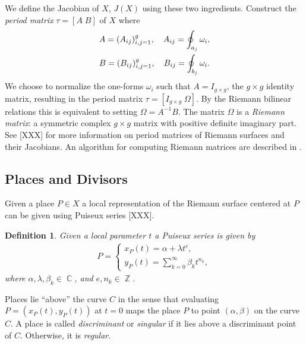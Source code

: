\documentclass[12pt]{article}
\newtheorem{definition}[theorem]{Definition}
\theoremstyle{definition}
\newtheorem{example}[theorem]{Example}
\DeclareMathOperator{\ZZ}{\mathbb{Z}}
\DeclareMathOperator{\CC}{\mathbb{C}}
\begin{document}
We define the Jacobian of $X$, $J(X)$ using these two
ingredients. Construct the {\it period matrix} $\tau = [A \; B]$ of $X$
where
\begin{gather} \label{eqn:periodmatrix}
  A = (A_{ij})_{i,j=1}^g, \quad A_{ij} = \oint_{a_j} \omega_i, \notag \\
  B = (B_{ij})_{i,j=1}^g, \quad B_{ij} = \oint_{b_j} \omega_i.
\end{gather}
We choose to normalize the one-forms $\omega_i$ such that $A = I_{g
  \times g}$, the $g \times g$ identity matrix, resulting in the period
matrix $\tau = [I_{g \times g} \; \Omega]$. By the Riemann bilinear
relations this is equivalent to setting $\Omega = A^{-1}B$. The matrix
$\Omega$ is a {\it Riemann matrix}: a symmetric complex $g \times g$
matrix with positive definite imaginary part. See [XXX] for more
information on period matrices of Riemann surfaces and their
Jacobians. An algorithm for computing Riemann matrices are described in
\cite{DeconinckPatterson08}.




\subsection{Places and Divisors}



Given a place $P \in X$ a local representation of the Riemann surface
centered at $P$ can be given using Puiseux series [XXX].
\begin{definition}\label{def:puiseux}
Given a local parameter $t$ a Puiseux series is given by
\begin{align} \label{eqn:puiseux}
  P =
  \begin{cases}
    x_P(t) = \alpha + \lambda t^e, \\
    y_P(t) = \sum_{k=0}^\infty \beta_k t^{n_k},
  \end{cases}
\end{align}
where $\alpha, \lambda, \beta_k \in \CC$, and $e, n_k \in \ZZ$.
\end{definition}
\noindent Places lie ``above'' the curve $C$ in the sense that
evaluating $P = (x_P(t), y_P(t))$ at $t=0$ maps the place $P$ to point
$(\alpha,\beta)$ on the curve $C$. A place is called {\it discriminant}
or {\it singular} if it lies above a discriminant point of
$C$. Otherwise, it is {\it regular}.
\end{document}

